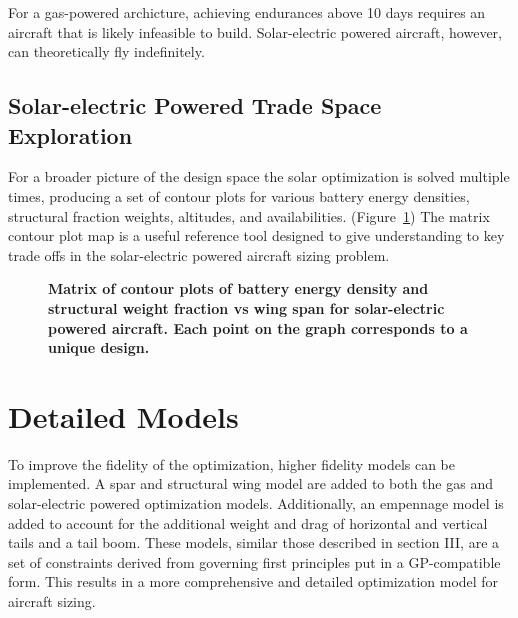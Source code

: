 \documentclass[]{aiaa-tc}%
\begin{document}
For a gas-powered archicture, achieving endurances above 10 days requires an aircraft that is likely infeasible to build.  Solar-electric powered aircraft, however, can theoretically fly indefinitely. 

\subsection{Solar-electric Powered Trade Space Exploration}

For a broader picture of the design space the solar optimization is solved multiple times, producing a set of contour plots for various battery energy densities, structural fraction weights, altitudes, and availabilities.  (Figure~\ref{f:solarcontours}) 
The matrix contour plot map is a useful reference tool designed to give understanding to key trade offs in the solar-electric powered aircraft sizing problem.

 \begin{figure}[H]
 \begin{subfigmatrix}{3}%
 \end{subfigmatrix}
 \caption{ \textbf{Matrix of contour plots of battery energy density and structural weight fraction vs wing span for solar-electric powered aircraft. Each point on the graph corresponds to a unique design.} }
 \label{f:solarcontours}
\end{figure}

\section{Detailed Models}

To improve the fidelity of the optimization, higher fidelity models can be implemented.  
A spar and structural wing model are added to both the gas and solar-electric powered optimization models.  
Additionally, an empennage model is added to account for the additional weight and drag of horizontal and vertical tails and a tail boom.  
These models, similar those described in section III, are a set of constraints derived from governing first principles put in a GP-compatible form. 
This results in a more comprehensive and detailed optimization model for aircraft sizing.   \\
\end{document}
